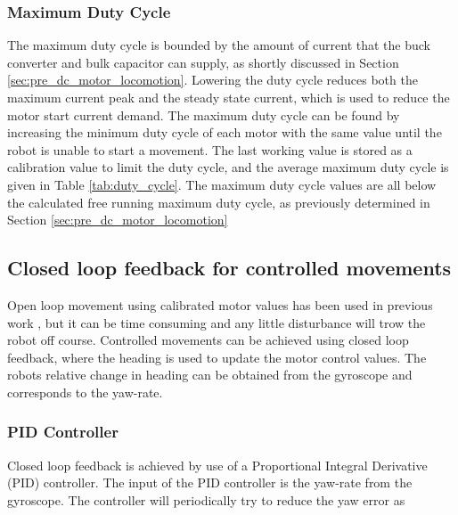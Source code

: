 \subsubsection{Maximum Duty Cycle}

The maximum duty cycle is bounded by the amount of current that the buck converter and bulk capacitor can supply, as shortly discussed in Section \ref{sec:pre_dc_motor_locomotion}.
Lowering the duty cycle reduces both the maximum current peak and the steady state current, which is used to reduce the motor start current demand.
The maximum duty cycle can be found by increasing the minimum duty cycle of each motor with the same value until the robot is unable to start a movement.
The last working value is stored as a calibration value to limit the duty cycle, and the average maximum duty cycle is given in Table \ref{tab:duty_cycle}.
The maximum duty cycle values are all below the calculated free running maximum duty cycle, as previously determined in Section \ref{sec:pre_dc_motor_locomotion}


\subsection{Closed loop feedback for controlled movements}

Open loop movement using calibrated motor values has been used in previous work \cite{legoc_uist_2016}, but it can be time consuming and any little disturbance will trow the robot off course.
Controlled movements can be achieved using closed loop feedback, where the heading is used to update the motor control values.
The robots relative change in heading can be obtained from the gyroscope and corresponds to the yaw-rate.

\subsubsection{PID Controller}


Closed loop feedback is achieved by use of a Proportional Integral Derivative (PID) controller.
The input of the PID controller is the yaw-rate from the gyroscope.
The controller will periodically try to reduce the yaw error as

